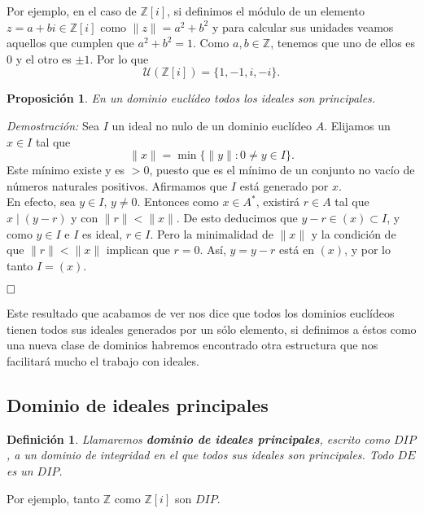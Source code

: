 \documentclass[12pt]{article}
\newtheorem{proposition}[theorem]{Proposición}
\newtheorem{definition}[theorem]{Definición}
\providecommand{\norm}[1]{\lVert#1\rVert}
\begin{document}
Por ejemplo, en el caso de $\mathbb{Z}[i]$, si definimos el módulo de un elemento $z = a+bi \in \mathbb{Z}[i]$ como $\norm{z} = a^{2} + b^{2}$ y para calcular sus unidades veamos aquellos que cumplen que $a^{2} + b^{2} = 1$. Como $a,b \in \mathbb{Z}$, tenemos que uno de ellos es $0$ y el otro es $\pm 1$. Por lo que $$\mathcal{U}(\mathbb{Z}[i]) = \lbrace 1, -1, i, -i \rbrace.$$

\begin{proposition}\label{eq:dedip} En un dominio euclídeo todos los ideales son principales.
\end{proposition}
\emph{Demostración: } Sea $I$ un ideal no nulo de un dominio euclídeo $A$. Elijamos un $x \in I$ tal que $$\norm{x} = \min \lbrace \norm{y} :0 \neq y \in I \rbrace.$$ Este mínimo existe y es $>0$, puesto que es el mínimo de un conjunto no vacío de números naturales positivos. Afirmamos que $I$ está generado por $x$.\vspace{0.2cm}\\
En efecto, sea $y \in I$, $y \neq 0$. Entonces como $x \in A^{\ast}$, existirá $r \in A$ tal que $x \mid (y-r)$ y con $\norm{r} < \norm{x}$. De esto deducimos que $y-r \in (x) \subset I$, y como $y \in I$ e $I$ es ideal, $r \in I$. Pero la minimalidad de $\norm{x}$ y la condición de que $\norm{r} < \norm{x}$ implican que $r = 0$. Así, $y = y-r$ está en $(x)$, y por lo tanto $I = (x)$.

$\hfill \square$

Este resultado que acabamos de ver nos dice que todos los dominios euclídeos tienen todos sus ideales generados por un sólo elemento, si definimos a éstos como una nueva clase de dominios habremos encontrado otra estructura que nos facilitará mucho el trabajo con ideales. 

\subsection{Dominio de ideales principales}

\begin{definition} Llamaremos \textbf{dominio de ideales principales}, escrito como $DIP$, a un dominio de integridad en el que todos sus ideales son principales. Todo $DE$ es un $DIP$.
\end{definition} 

Por ejemplo, tanto $\mathbb{Z}$ como $\mathbb{Z}[i]$ son $DIP$.
\end{document}
